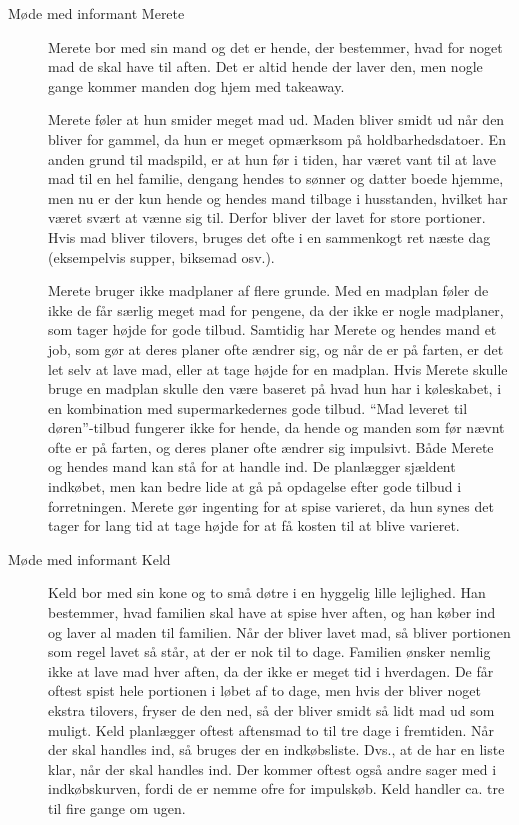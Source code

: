 \begin{description}
\item[Møde med informant Merete]
Merete bor med sin mand og det er hende, der bestemmer, hvad for noget mad de skal have til aften. Det er altid hende der laver den, men nogle gange kommer manden dog hjem med takeaway.

Merete føler at hun smider meget mad ud. Maden bliver smidt ud når den bliver for gammel, da hun er meget opmærksom på holdbarhedsdatoer. En anden grund til madspild, er at hun før i tiden, har været vant til at lave mad til en hel familie, dengang hendes to sønner og datter boede hjemme, men nu er der kun hende og hendes mand tilbage i husstanden, hvilket har været svært at vænne sig til. Derfor bliver der lavet for store portioner. Hvis mad bliver tilovers, bruges det ofte i en sammenkogt ret næste dag (eksempelvis supper, biksemad osv.).

Merete bruger ikke madplaner af flere grunde. Med en madplan føler de ikke de får særlig meget mad for pengene, da der ikke er nogle madplaner, som tager højde for gode tilbud. Samtidig har Merete og hendes mand et job, som gør at deres planer ofte ændrer sig, og når de er på farten, er det let selv at lave mad, eller at tage højde for en madplan. Hvis Merete skulle bruge en madplan skulle den være baseret på hvad hun har i køleskabet, i en kombination med supermarkedernes gode tilbud. ``Mad leveret til døren''-tilbud fungerer ikke for hende, da hende og manden som før nævnt ofte er på farten, og deres planer ofte ændrer sig impulsivt. Både Merete og hendes mand kan stå for at handle ind. De planlægger sjældent indkøbet, men kan bedre lide at gå på opdagelse efter gode tilbud i forretningen. Merete gør ingenting for at spise varieret, da hun synes det tager for lang tid at tage højde for at få kosten til at blive varieret.

\item[Møde med informant Keld]

Keld bor med sin kone og to små døtre i en hyggelig lille lejlighed. Han bestemmer, hvad familien skal have at spise hver aften, og han køber ind og laver al maden til familien. Når der bliver lavet mad, så bliver portionen som regel lavet så står, at der er nok til to dage. Familien ønsker nemlig ikke at lave mad hver aften, da der ikke er meget tid i hverdagen. De får oftest spist hele portionen i løbet af to dage, men hvis der bliver noget ekstra tilovers, fryser de den ned, så der bliver smidt så lidt mad ud som muligt. Keld planlægger oftest aftensmad to til tre dage i fremtiden. Når der skal handles ind, så bruges der en indkøbsliste. Dvs., at de har en liste klar, når der skal handles ind. Der kommer oftest også andre sager med i indkøbskurven, fordi de er nemme ofre for impulskøb. Keld handler ca. tre til fire gange om ugen.


\end{description}
